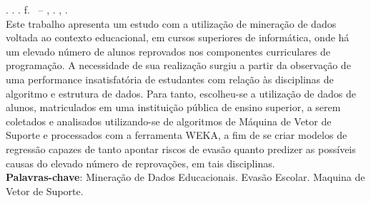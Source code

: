 % 
%


\begin{resumo}[RESUMO]
\begin{SingleSpacing}

\imprimirautorcitacao. \imprimirtitulo. \imprimirdata. \pageref {LastPage} f. \imprimirprojeto\ – \imprimirprograma, \imprimirinstituicao. \imprimirlocal, \imprimirdata.\\

Este trabalho apresenta um estudo com a utilização de mineração de dados voltada ao contexto educacional, em cursos superiores de informática, onde há um elevado número de alunos reprovados nos componentes curriculares de programação. A necessidade de sua realização surgiu a partir da observação de uma performance insatisfatória de estudantes com relação às disciplinas de algoritmo e estrutura de dados. Para tanto, escolheu-se a utilização de dados de alunos, matriculados em uma instituição pública de ensino superior, a serem coletados e analisados utilizando-se de algoritmos de Máquina de Vetor de Suporte e processados com a ferramenta WEKA, a fim de se criar modelos de regressão capazes de tanto apontar riscos de evasão quanto predizer as possíveis causas do elevado número de reprovações, em tais disciplinas.\\

\textbf{Palavras-chave}: Mineração de Dados Educacionais. Evasão Escolar. Maquina de Vetor de Suporte.

\end{SingleSpacing}
\end{resumo}

